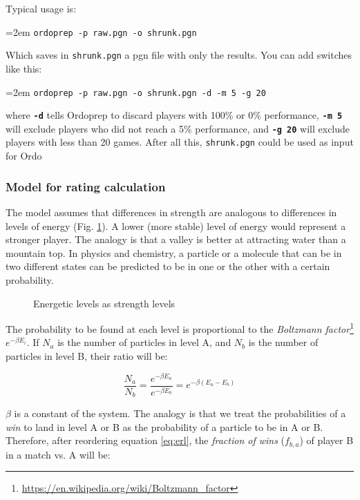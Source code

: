 \documentclass[12pt]{article}
\newcommand{\swtch} [1] {\texttt{\textbf{#1}}}
\newcommand{\filename} [1] {\texttt{#1}}
\newcommand{\cmdln}[1]{
	\par
	\begingroup
		\leftskip=2em
		\addtolength{\rightskip}{0em}
		\noindent \small{\texttt{#1}}
		\par
	\endgroup
}
\begin{document}
Typical usage is:

\cmdln{ordoprep -p raw.pgn -o shrunk.pgn}

Which saves in \filename{shrunk.pgn} a pgn file with only the results. 
You can add switches like this:

\cmdln{ordoprep -p raw.pgn -o shrunk.pgn -d -m 5 -g 20}

where \swtch{-d} tells Ordoprep to discard players with 100\% or 0\% performance, \swtch{-m~5}
will exclude players who did not reach a 5\% performance, and \swtch{-g~20} will exclude players with less than 20 games.
After all this, \filename{shrunk.pgn} could be used as input for Ordo

\subsubsection*{Model for rating calculation}

The model assumes that differences in strength are analogous to differences in levels of energy (Fig. \ref{fig:figlevels1}). 
A lower (more stable) level of energy would represent a stronger player.
The analogy is that a valley is better at attracting water than a mountain top. 
In physics and chemistry, a particle or a molecule that can be in two different states can be predicted to be in one or the other with a certain probability.

	\begin{figure}[htb]
	\caption{\label{fig:figlevels1} Energetic levels as strength levels}
	\end{figure}

The probability to be found at each level is proportional to the 
\textit{Boltzmann factor}\footnote{\url{https://en.wikipedia.org/wiki/Boltzmann_factor}} $e^{-\beta E_{i}}$.
If $N_{a}$ is the number of particles in level A, and $N_{b}$ is the number of particles in level B, their ratio will be:

	\begin{equation} \label{eq:erl}
	\frac{N_{a}}{N_{b}} = \frac{ e^{-\beta E_{a}} }{ e^{-\beta E_{b}} } = e^{-\beta(E_{a}-E_{b})}
	\end{equation}

$\beta$ is a constant of the system.
The analogy is that we treat the probabilities of a \textit{win} to land in level A or B as the probability of a particle to be in A or B.
Therefore, after reordering equation \ref{eq:erl}, the \textit{fraction of wins} ($f_{b,a}$) of player B in a match vs. A will be:
\end{document}
